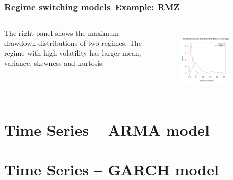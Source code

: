 \documentclass{beamer}
\newcommand\Fontviii{\fontsize{8}{9.2}\selectfont}
\begin{document}
\begin{frame}
\frametitle{Regime switching models--Example: RMZ}
\Fontviii

\begin{columns}[c] %

The right panel shows the maximum drawdown distributions of two regimes. The regime with high volatility has larger mean, variance, skewness and kurtosis.

\begin{figure}[h]
\centering 
\includegraphics[width=0.8\textwidth]{../results/regime/RMZ_mon1_mdd}
\label{fig: RMZregime_mdd}
\end{figure}
\end{columns}

\end{frame}

\section{Time Series – ARMA model}

\section{Time Series – GARCH model}
\end{document}
